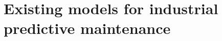 
\chapter{Existing models for industrial predictive maintenance}
\normalsize
\label{ch3}

\minitoc
\clearpage